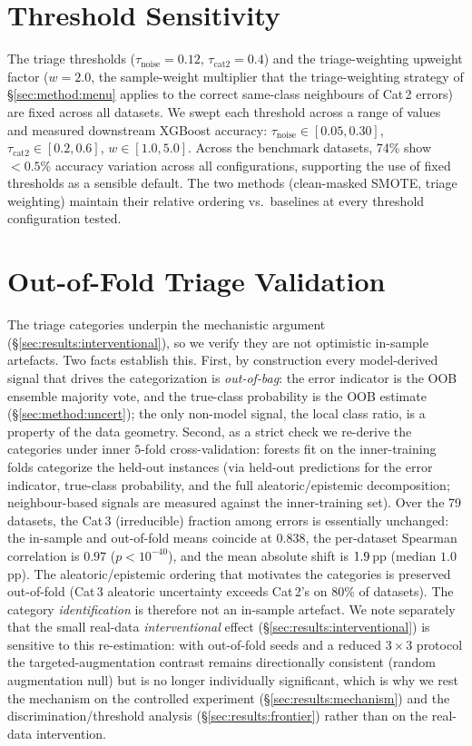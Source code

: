 \appendix

\section{Threshold Sensitivity}\label{app:sensitivity}

The triage thresholds ($\tau_{\text{noise}} = 0.12$, $\tau_{\text{cat2}} = 0.4$)
and the triage-weighting upweight factor ($w = 2.0$, the sample-weight multiplier
that the triage-weighting strategy of \S\ref{sec:method:menu} applies to the correct
same-class neighbours of Cat\,2 errors) are fixed across all datasets. We swept each threshold across a
range of values and measured downstream XGBoost accuracy: $\tau_{\text{noise}}
\in [0.05, 0.30]$, $\tau_{\text{cat2}} \in [0.2, 0.6]$, $w \in [1.0, 5.0]$.
Across the benchmark datasets, 74\% show $< 0.5\%$ accuracy
variation across all configurations, supporting the use of fixed thresholds
as a sensible default. The two methods (clean-masked SMOTE, triage
weighting) maintain their relative ordering vs.\ baselines at every threshold
configuration tested.

\section{Out-of-Fold Triage Validation}\label{app:oof}

The triage categories underpin the mechanistic argument (\S\ref{sec:results:interventional}),
so we verify they are not optimistic in-sample artefacts. Two facts establish this.
First, by construction every model-derived signal that drives the categorization is
\emph{out-of-bag}: the error indicator is the OOB ensemble majority vote, and the
true-class probability is the OOB estimate (\S\ref{sec:method:uncert}); the only
non-model signal, the local class ratio, is a property of the data geometry.
Second, as a strict check we re-derive the categories under inner $5$-fold
cross-validation: forests fit on the inner-training folds categorize the held-out
instances (via held-out predictions for the error indicator, true-class
probability, and the full aleatoric/epistemic decomposition; neighbour-based
signals are measured against the inner-training set). Over the 79 datasets, the
Cat\,3 (irreducible) fraction among errors is essentially unchanged: the in-sample
and out-of-fold means coincide at $0.838$, the per-dataset Spearman correlation is
$0.97$ ($p<10^{-40}$), and the mean absolute shift is $1.9$\,pp (median
$1.0$\,pp). The aleatoric/epistemic ordering that motivates the categories is
preserved out-of-fold (Cat\,3 aleatoric uncertainty exceeds Cat\,2's on $80\%$ of
datasets). The category \emph{identification} is therefore not an in-sample
artefact. We note separately that the small real-data \emph{interventional} effect
(\S\ref{sec:results:interventional}) is sensitive to this re-estimation: with
out-of-fold seeds and a reduced $3\times3$ protocol the targeted-augmentation
contrast remains directionally consistent (random augmentation null) but is no
longer individually significant, which is why we rest the mechanism on the
controlled experiment (\S\ref{sec:results:mechanism}) and the
discrimination/threshold analysis (\S\ref{sec:results:frontier}) rather than on the
real-data intervention.

